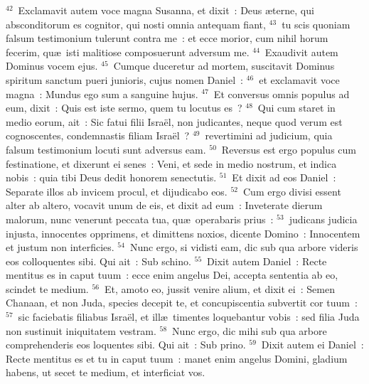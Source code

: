 ${}^{42}$~Exclamavit autem voce magna Susanna, et dixit~: Deus \ae terne, qui absconditorum es cognitor, qui nosti omnia antequam fiant,
${}^{43}$~tu scis quoniam falsum testimonium tulerunt contra me~: et ecce morior, cum nihil horum fecerim, qu\ae\ isti malitiose composuerunt adversum me.
${}^{44}$~Exaudivit autem Dominus vocem ejus.
${}^{45}$~Cumque duceretur ad mortem, suscitavit Dominus spiritum sanctum pueri junioris, cujus nomen Daniel~:
${}^{46}$~et exclamavit voce magna~: Mundus ego sum a sanguine hujus.
${}^{47}$~Et conversus omnis populus ad eum, dixit~: Quis est iste sermo, quem tu locutus es~?
${}^{48}$~Qui cum staret in medio eorum, ait~: Sic fatui filii Isra\"el, non judicantes, neque quod verum est cognoscentes, condemnastis filiam Isra\"el~?
${}^{49}$~revertimini ad judicium, quia falsum testimonium locuti sunt adversus eam.
${}^{50}$~Reversus est ergo populus cum festinatione, et dixerunt ei senes~: Veni, et sede in medio nostrum, et indica nobis~: quia tibi Deus dedit honorem senectutis.
${}^{51}$~Et dixit ad eos Daniel~: Separate illos ab invicem procul, et dijudicabo eos.
${}^{52}$~Cum ergo divisi essent alter ab altero, vocavit unum de eis, et dixit ad eum~: Inveterate dierum malorum, nunc venerunt peccata tua, qu\ae\ operabaris prius~:
${}^{53}$~judicans judicia injusta, innocentes opprimens, et dimittens noxios, dicente Domino~: Innocentem et justum non interficies.
${}^{54}$~Nunc ergo, si vidisti eam, dic sub qua arbore videris eos colloquentes sibi. Qui ait~: Sub schino.
${}^{55}$~Dixit autem Daniel~: Recte mentitus es in caput tuum~: ecce enim angelus Dei, accepta sententia ab eo, scindet te medium.
${}^{56}$~Et, amoto eo, jussit venire alium, et dixit ei~: Semen Chanaan, et non Juda, species decepit te, et concupiscentia subvertit cor tuum~:
${}^{57}$~sic faciebatis filiabus Isra\"el, et ill\ae\ timentes loquebantur vobis~: sed filia Juda non sustinuit iniquitatem vestram.
${}^{58}$~Nunc ergo, dic mihi sub qua arbore comprehenderis eos loquentes sibi. Qui ait~: Sub prino.
${}^{59}$~Dixit autem ei Daniel~: Recte mentitus es et tu in caput tuum~: manet enim angelus Domini, gladium habens, ut secet te medium, et interficiat vos.


